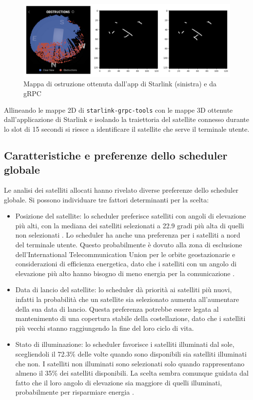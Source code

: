 \begin{figure}[htbp]
  \centering
  \includegraphics[width=0.7\linewidth]{./res/img/obstruction_maps.png}
  \caption{Mappa di ostruzione ottenuta dall'app di Starlink (sinistra) e da gRPC \cite{sparky8512_starlink-grpc-tools_nodate}\cite{tanveer_making_2023}}
  \label{fig:obstruction-maps}
\end{figure}

Allineando le mappe 2D di \verb|starlink-grpc-tools| con le mappe 3D ottenute dall'applicazione di Starlink e isolando la traiettoria del satellite connesso durante lo slot di 15 secondi si riesce a identificare il satellite che serve il terminale utente.

\subsection{Caratteristiche e preferenze dello scheduler globale}
Le analisi dei satelliti allocati hanno rivelato diverse preferenze dello scheduler globale. Si possono individuare tre fattori determinanti per la scelta:
\begin{itemize}
  \item Posizione del satellite: lo scheduler preferisce satelliti con angoli di elevazione più alti, con la mediana dei satelliti selezionati a 22.9 gradi più alta di quelli non selezionati \cite{tanveer_making_2023}.
  Lo scheduler ha anche una preferenza per i satelliti a nord del terminale utente. Questo probabilmente è dovuto alla zona di esclusione dell'International Telecommunication Union per le orbite geostazionarie e considerazioni di efficienza energetica, dato che i satelliti con un angolo di elevazione più alto hanno bisogno di meno energia per la comunicazione \cite{tanveer_making_2023}.
  \item Data di lancio del satellite: lo scheduler dà priorità ai satelliti più nuovi, infatti la probabilità che un satellite sia selezionato aumenta all'aumentare della sua data di lancio. Questa preferenza potrebbe essere legata al mantenimento di una copertura stabile della costellazione, dato che i satelliti più vecchi stanno raggiungendo la fine del loro ciclo di vita.
  \item Stato di illuminazione: lo scheduler favorisce i satelliti illuminati dal sole, scegliendoli il 72.3\% delle volte quando sono disponibili sia satelliti illuminati che non. I satelliti non illuminati sono selezionati solo quando rappresentano almeno il 35\% dei satelliti disponibili. La scelta sembra comunque guidata dal fatto che il loro angolo di elevazione sia maggiore di quelli illuminati, probabilmente per risparmiare energia \cite{tanveer_making_2023}.
\end{itemize}

